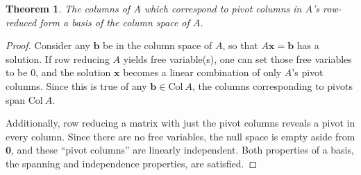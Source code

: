 \documentclass[draft,12pt]{report}
\newtheorem{theorem}{Theorem}
\renewcommand{\vec}[1]{\mathbf{#1}}
\begin{document}
\begin{theorem}
    The columns of $A$ which correspond to pivot columns in $A$'s row-reduced form a basis of the column space of $A$.
\end{theorem}
\begin{proof}
    Consider any $\vec{b}$ be in the column space of $A$, so that $A\vec{x} = \vec{b}$ has a solution. If row reducing $A$ yields free variable(s), one can set those free variables to be 0, and the solution $\vec{x}$ becomes a linear combination of only $A$'s pivot columns. Since this is true of any $\vec{b} \in \mathrm{Col\ } A$, the columns corresponding to pivots span $\mathrm{Col\ } A$.
    
    Additionally, row reducing a matrix with just the pivot columns reveals a pivot in every column. Since there are no free variables, the null space is empty aside from $\vec{0}$, and these ``pivot columns'' are linearly independent. Both properties of a basis, the spanning and independence properties, are satisfied.
\end{proof}
\end{document}
